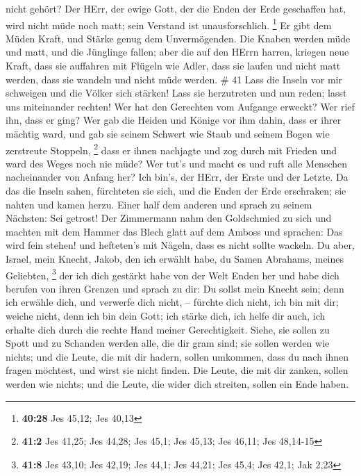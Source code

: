 nicht gehört? Der HErr, der ewige Gott, der die Enden der Erde
geschaffen hat, wird nicht müde noch matt; sein Verstand ist
unausforschlich. \footnote{\textbf{40:28} Jes 45,12; Jes 40,13}
 Er gibt dem Müden Kraft, und Stärke genug dem
Unvermögenden.  Die Knaben werden müde und matt, und die
Jünglinge fallen;  aber die auf den HErrn harren, kriegen
neue Kraft, dass sie auffahren mit Flügeln wie Adler, dass sie laufen
und nicht matt werden, dass sie wandeln und nicht müde werden. \# 41
 Lass die Inseln vor mir schweigen und die Völker sich
stärken! Lass sie herzutreten und nun reden; lasst uns miteinander
rechten!  Wer hat den Gerechten vom Aufgange erweckt? Wer
rief ihn, dass er ging? Wer gab die Heiden und Könige vor ihm dahin,
dass er ihrer mächtig ward, und gab sie seinem Schwert wie Staub und
seinem Bogen wie zerstreute Stoppeln, \footnote{\textbf{41:2} Jes 41,25;
  Jes 44,28; Jes 45,1; Jes 45,13; Jes 46,11; Jes 48,14-15} 
dass er ihnen nachjagte und zog durch mit Frieden und ward des Weges
noch nie müde?  Wer tut's und macht es und ruft alle
Menschen nacheinander von Anfang her? Ich bin's, der HErr, der Erste und
der Letzte.  Da das die Inseln sahen, fürchteten sie sich,
und die Enden der Erde erschraken; sie nahten und kamen herzu.
 Einer half dem anderen und sprach zu seinem Nächsten: Sei
getrost!  Der Zimmermann nahm den Goldschmied zu sich und
machten mit dem Hammer das Blech glatt auf dem Amboss und sprachen: Das
wird fein stehen! und hefteten's mit Nägeln, dass es nicht sollte
wackeln.  Du aber, Israel, mein Knecht, Jakob, den ich
erwählt habe, du Samen Abrahams, meines Geliebten, \footnote{\textbf{41:8}
  Jes 43,10; Jes 42,19; Jes 44,1; Jes 44,21; Jes 45,4; Jes 42,1; Jak
  2,23}  der ich dich gestärkt habe von der Welt Enden her
und habe dich berufen von ihren Grenzen und sprach zu dir: Du sollst
mein Knecht sein; denn ich erwähle dich, und verwerfe dich nicht, --
 fürchte dich nicht, ich bin mit dir; weiche nicht, denn
ich bin dein Gott; ich stärke dich, ich helfe dir auch, ich erhalte dich
durch die rechte Hand meiner Gerechtigkeit.  Siehe, sie
sollen zu Spott und zu Schanden werden alle, die dir gram sind; sie
sollen werden wie nichts; und die Leute, die mit dir hadern, sollen
umkommen,  dass du nach ihnen fragen möchtest, und wirst
sie nicht finden. Die Leute, die mit dir zanken, sollen werden wie
nichts; und die Leute, die wider dich streiten, sollen ein Ende haben.
